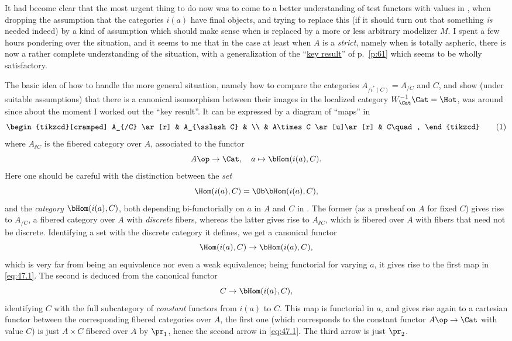 \label{sec:47}%
It had become clear that the most urgent thing to do now was to come
to a better understanding of test functors with values in \Cat, when
dropping the assumption that the categories $i(a)$ have final objects,
and trying to replace this (if it should turn out that something
\emph{is} needed indeed) by a kind of assumption which should make
sense when \Cat{} is replaced by a more or less arbitrary modelizer
$M$. I spent a few hours pondering over the situation, and it seems to
me that in the case at least when $A$ is a \emph{strict}, namely when
\Ahat{} is totally aspheric, there is now a rather complete
understanding of the situation, with a generalization of the
``\hyperref[thm:keyresult]{key result}'' of p.\ \ref{p:61} which seems
to be wholly satisfactory.

The basic idea of how to handle the more general situation,
namely how to compare the categories $A_{/i^*(C)}=A_{/C}$ and $C$, and
show (under suitable assumptions) that there is a canonical
isomorphism between their images in the localized category
$W_\Cat^{-1}\Cat=\Hot$, was around since about the moment I worked out
the ``key result''. It can be expressed by a diagram of ``maps'' in
\Cat
\begin{equation}
  \label{eq:47.1}
    \begin{tikzcd}[cramped]
      A_{/C} \ar[r] & A_{\sslash C} & \\
      & A\times C \ar[u]\ar[r] & C\quad,
    \end{tikzcd}
  \tag{1}
\end{equation}
where $A_{\sslash C}$ is the fibered category over $A$, associated to
the functor
\[ A\op\to\Cat, \quad a\mapsto\bHom(i(a),C).\]
Here one should be careful with the distinction between the \emph{set}
\[ \Hom(i(a),C) = \Ob \bHom(i(a),C),\]
and the \emph{category} $\bHom(i(a),C)$, both depending
bi-functorially on $a$ in $A$ and $C$ in \Cat. The former (as a
presheaf on $A$ for fixed $C$) gives rise to $A_{/C}$, a fibered
category over $A$ with \emph{discrete} fibers, whereas the latter
gives rise to $A_{\sslash C}$, which is fibered over $A$ with fibers
that need not be discrete. Identifying a set with the discrete
category it defines, we get a canonical functor
\[ \Hom(i(a),C) \to \bHom(i(a),C),\]
which is very far from being an equivalence nor even a weak
equivalence; being functorial for varying $a$, it gives rise to the
first map in \eqref{eq:47.1}. The second is deduced from the canonical
functor
\[C \to \bHom(i(a),C),\]
identifying $C$ with the full subcategory of \emph{constant} functors
from $i(a)$ to $C$. This map is functorial in $a$, and gives rise
again to a cartesian functor between the corresponding fibered
categories over $A$, the first one (which corresponds to the constant
functor $A\op\to\Cat$ with value $C$) is just $A\times C$ fibered over
$A$ by $\pr_1$, hence the second arrow in \eqref{eq:47.1}. The third
arrow is just $\pr_2$.

